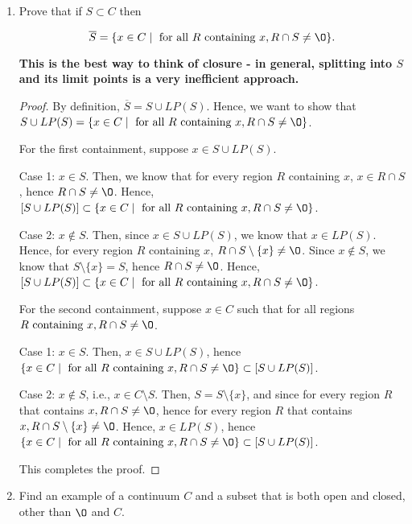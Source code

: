 \documentclass[11pt]{article}
\renewcommand{\emptyset}{\O}
\renewcommand{\_}[1]{\underline{ #1 }}
\theoremstyle{definition}
\numberwithin{equation}{subsection}
\begin{document}
\begin{enumerate}

\item Prove that if $S\subset C$ then

$$ \overline{S}=\{x\in C\mid \text{ for all }  R \text{ containing } x, R\cap S\neq \emptyset\}.$$

{\bf This is the best way to think of closure - in general, splitting into $S$ and its limit points is a very inefficient
approach.}

\begin{proof}
By definition, $\overline{S} = S \cup LP(S)$. Hence, we want to show that $S \cup LP(S) = \{x\in C\mid \text{ for all }  R \text{ containing } x, R\cap S\neq \emptyset\}$.

For the first containment, suppose $x \in S \cup LP(S)$.

Case 1: $x \in S$. Then, we know that for every region $R$ containing $x$, $x \in R \cap S$, hence $R \cap S \not = \emptyset$. Hence, $[S \cup LP(S)] \subset \{x\in C\mid \text{ for all }  R \text{ containing } x, R\cap S\neq \emptyset\}$.

Case 2: $x \notin S$. Then, since $x \in S \cup LP(S)$, we know that $x \in LP(S)$. Hence, for every region $R$ containing $x$, $R \cap S \setminus \{x\} \not= \emptyset$. Since $x \notin S$, we know that $S \setminus \{x\} = S$, hence $R \cap S \not = \emptyset$. Hence, $[S \cup LP(S)] \subset \{x\in C\mid \text{ for all }  R \text{ containing } x, R\cap S\neq \emptyset\}$.

For the second containment, suppose $x \in C$ such that for all regions $R \text{ containing } x, R\cap S\neq \emptyset$.

Case 1: $x \in S$. Then, $x \in S \cup LP(S)$, hence $\{x\in C\mid \text{ for all }  R \text{ containing } x, R\cap S\neq \emptyset\} \subset [S \cup LP(S)]$.

Case 2: $x \notin S$, i.e., $x \in C \setminus S$. Then, $S = S \setminus \{x\}$, and since for every region $R$ that contains $x, R \cap S \neq \emptyset$, hence for every region $R$ that contains $x, R \cap S \setminus \{x\} \neq \emptyset$. Hence, $x \in LP(S)$, hence $\{x\in C\mid \text{ for all }  R \text{ containing } x, R\cap S\neq \emptyset\} \subset [S \cup LP(S)]$.

This completes the proof.

\renewcommand\qedsymbol{QED}
\end{proof}

\item Find an example of a continuum $C$ and a subset that is both open and closed, other than $\emptyset $ and $C.$



\end{enumerate}
\end{document}
